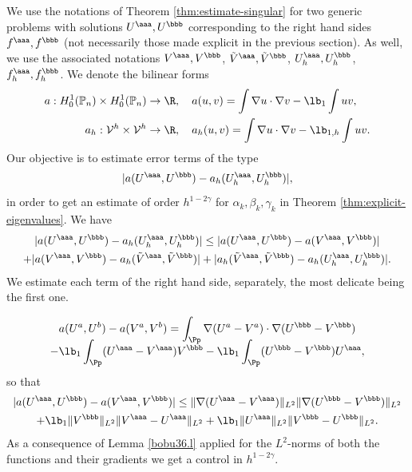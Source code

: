 We use the notations of Theorem \ref{thm:estimate-singular} for two generic problems with solutions $U^\aaa, U^\bbb$ corresponding to the right hand sides $f^\aaa, f^\bbb$ (not necessarily those made explicit in the previous section). As well, we use the associated notations $V^\aaa, V^\bbb$, $\tilde V^\aaa, \tilde V^\bbb$, $U_h^\aaa, U_h^\bbb$, $f_h^\aaa, f_h^\bbb$. We denote the bilinear forms\vspace*{-3pt}
\begin{align*}
a: H^1_0(\Bbb P_n) \times H^1_0(\Bbb P_n) &\to \R,\quad a(u,v)= \int \nabla u \cdot \nabla v -\lb_1 \int uv,\\
a_h: {\mathcal V}^h \times{\mathcal V}^h &\to \R, \quad a_h(u,v)= \int \nabla u \cdot \nabla v -\lb_{1,h} \int uv.
\end{align*}
Our objective is to estimate error terms of the type\vspace*{-3pt}
\[
|a(U^\aaa,U^\bbb)-a_h(U_h^\aaa, U_h^\bbb)|,
\]
in order to get an estimate of order $h^{1-2\gamma}$ for $\alpha_k,\beta_k,\gamma_k$ in Theorem \ref{thm:explicit-eigenvalues}.
We have\vspace*{-3pt}
\begin{multline}
\label{eq:estimate-a(U,V)}
|a(U^\aaa,U^\bbb)-a_h(U_h^\aaa, U_h^\bbb)|
\le
|a(U^\aaa,U^\bbb)-a(V^\aaa, V^\bbb)|\\
+ |a(V^\aaa,V^\bbb)-a_h(\tilde V^\aaa, \tilde V^\bbb)|+ |a_h(\tilde V^\aaa, \tilde V^\bbb)-a_h(U_h^\aaa, U_h^\bbb)|.
\end{multline}
We estimate each term of the right hand side, separately, the most delicate being the first one.

\vspace*{-1.8\baselineskip}
\begin{multline*}
a(U^a,U^b)-a(V^a, V^b)= \int_\Pp \nabla (U^a-V^a)\cdot \nabla (U^\bbb-V^\bbb) \\[-8pt]
- \lb_1 \int_\Pp (U^\aaa-V^\aaa) V^\bbb- \lb_1 \int_\Pp (U^\bbb-V^\bbb) U^\aaa,
\end{multline*}
so that\vspace*{-5pt}
\begin{multline*}
|a(U^\aaa,U^\bbb)-a(V^\aaa, V^\bbb)|
\leq \| \nabla (U^\aaa-V^\aaa)\|_{L^2} \| \nabla (U^\bbb-V^\bbb)\|_{L^2}\\
+ \lb_1\|V^\bbb\|_{L^2} \|V^\aaa-U^\aaa\|_{L^2}+ \lb_1\|U^\aaa\|_{L^2} \|V^\bbb-U^\bbb\|_{L^2}.\end{multline*}
As a consequence of Lemma \ref{bobu36.l} applied for the $L^2$-norms of both the functions and their gradients we get a control in $h^{1-2\gamma}$.

